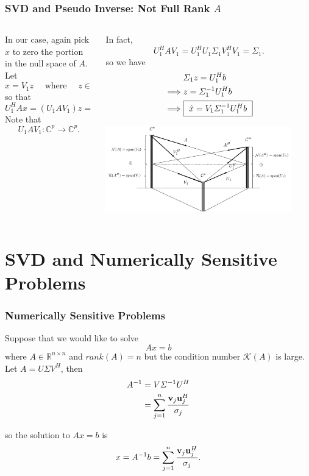 \documentclass{beamer}
\begin{document}
\begin{frame}\frametitle{SVD and Pseudo Inverse: Not Full Rank $A$}
	\begin{columns}
		\begin{column}{0.5\textwidth}
			In our case, again pick $x$ to zero the portion in the null space of $A$.  Let
			\[ 
				x = V_1z \quad \text{ where }  \quad z \in \mathbb{C}^p 
			\] 
			so that 
			\[ 
				U_1^HAx = \left(U_1AV_1\right) z = U_1^Hb. 
			\]	
			Note that 
			\[
				U_1AV_1: \mathbb{C}^p \to \mathbb{C}^p.
			\]
		\end{column}
		\begin{column}{0.5\textwidth}
			In fact,
			\[ 
				U_1^H A V_1 = U_1^H U_1 \Sigma_1 V_1^H V_1 = \Sigma_1.
			\]
			so we have
			\begin{align*}
				& \Sigma_1 z = U_1^Hb \\
				\implies & z = \Sigma_1^{-1}U_1^Hb \\
				\implies & \fbox{ $\hat{x} = V_1\Sigma_1^{-1}U_1^Hb$ }
			\end{align*}
			\begin{center}
				\includegraphics[width=0.9\textwidth]
					{figures/chap7_svd_1}
			\end{center}					
		\end{column}
	\end{columns}


	
\end{frame}

\section{SVD and Numerically Sensitive Problems}
\frame{\sectionpage}

\begin{frame}\frametitle{Numerically Sensitive Problems}
	Suppose that we would like to solve
	\[ 
		Ax = b  
	\]
	where $A \in \mathbb{R}^{n\times n}$ and $rank(A) = n$ but the condition number $\mathcal{K}(A)$ is large.  Let $A= U\Sigma V^H$, then 
	\begin{align*}
		 A^{-1} 
		 	&= V\Sigma^{-1} U^H\\
			&= \sum_{j=1}^{n}\frac{\mathbf{v}_j \mathbf{u}_j^H}{\sigma_j}
	\end{align*}
	
	so the solution to $Ax = b$ is
	\[ 
		x = A^{-1}b 
		  = \sum_{j=1}^{n}\frac{\mathbf{v}_j \mathbf{u}_j^H}{\sigma_j}.
	\]	
\end{frame}
\end{document}
